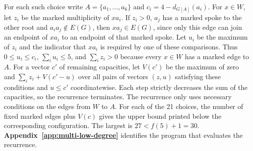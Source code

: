\documentclass[preprint,11pt,numbers]{elsarticle-arxiv}
\numberwithin{equation}{section}
\theoremstyle{definition}
\begin{document}
For each such choice write $A=\{a_1,\ldots,a_6\}$ and
$c_i=4-d_{G[A]}(a_i)$. For $x\in W$, let $z_i$ be the
marked multiplicity of $xa_i$. If $z_i>0$, $a_j$ has a
marked spoke to the other root and $a_ia_j\notin E(G)$,
then $xa_j\in E(G)$, since only this edge can join an endpoint
of $xa_i$ to an endpoint of that marked spoke. Let $u_i$ be the maximum of $z_i$ and the
indicator that $xa_i$ is required by one of these comparisons.
Thus $0\le u_i\le c_i$, $\sum_i u_i\le5$, and
$\sum_i z_i>0$ because every $x\in W$ has a marked edge to $A$.
For a vector $c'$ of remaining capacities, let $V(c')$ be
the maximum of zero and $\sum_i z_i+V(c'-u)$ over all
pairs of vectors $(z,u)$ satisfying these conditions and $u\le c'$
coordinatewise. Each step strictly decreases the sum of
the capacities, so the recurrence terminates. The recurrence
only uses necessary conditions on the edges from $W$ to $A$.
For each of the 21 choices, the number of fixed marked edges plus
$V(c)$ gives the upper bound printed below the corresponding
configuration. The largest is $27< f(5)+1=30$.
\textbf{Appendix~\ref{app:multi-low-degree}} identifies the program
that evaluates the recurrence.
\end{document}
